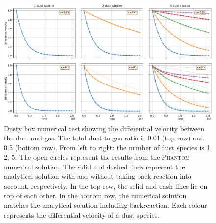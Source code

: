 \documentclass[fleqn,usenatbib]{mnras}
\begin{document}
\begin{figure}
   \begin{center}
      \includegraphics[width=\textwidth]{figs/dustybox_differential_velocity_comparison.pdf}
      \caption{Dusty box numerical test showing the differential velocity
         between the dust and gas. The total dust-to-gas ratio is 0.01 (top row)
         and 0.5 (bottom row). From left to right: the number of dust species is
         1, 2, 5. The open circles represent the results from the
         \textsc{Phantom} numerical solution. The solid and dashed lines
         represent the analytical solution with and without taking back reaction
         into account, respectively. In the top row, the solid and dash lines
         lie on top of each other. In the bottom row, the numerical solution
         matches the analytical solution including backreaction. Each colour
         represents the differential velocity of a dust species.%
         \label{fig:dustybox}}
   \end{center}
\end{figure}
\end{document}
